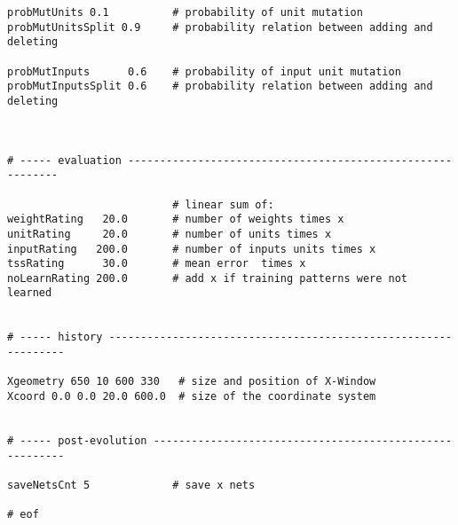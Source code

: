 {\begin{verbatim}
probMutUnits 0.1          # probability of unit mutation 
probMutUnitsSplit 0.9     # probability relation between adding and deleting

probMutInputs      0.6    # probability of input unit mutation 
probMutInputsSplit 0.6    # probability relation between adding and deleting



# ----- evaluation -----------------------------------------------------------

                          # linear sum of:
weightRating   20.0       # number of weights times x
unitRating     20.0       # number of units times x
inputRating   200.0       # number of inputs units times x
tssRating      30.0       # mean error  times x
noLearnRating 200.0       # add x if training patterns were not learned


# ----- history ---------------------------------------------------------------

Xgeometry 650 10 600 330   # size and position of X-Window
Xcoord 0.0 0.0 20.0 600.0  # size of the coordinate system


# ----- post-evolution --------------------------------------------------------

saveNetsCnt 5             # save x nets

# eof


\end{verbatim}
}
